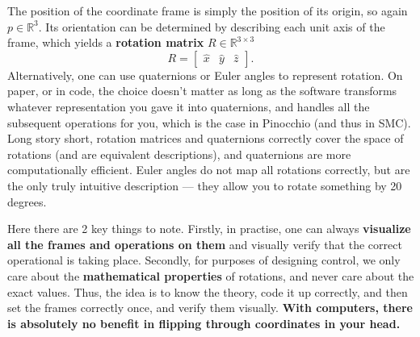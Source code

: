 The position of the coordinate frame is simply the position
of its origin, so again $  p \in \mathbb{R}^{3}    $.
Its orientation can be determined by describing each unit axis
of the frame, which yields a \textbf{rotation matrix}
$ R \in \mathbb{R}^{3 \times 3}  $
\begin{equation}
		R = \begin{bmatrix} \hat{x} & \hat{y} & \hat{z} \end{bmatrix} .
\end{equation}
Alternatively, one can use quaternions or Euler angles
to represent rotation.
On paper, or in code, the choice doesn't matter as long as the software
transforms whatever representation you gave it into
quaternions, and handles all the subsequent operations for you,
which is the case in Pinocchio (and thus in SMC).
Long story short, 
rotation matrices and quaternions correctly
cover the space of rotations (and are equivalent descriptions), 
and quaternions are more
computationally efficient.
Euler angles do not map all rotations correctly,
but are the only truly intuitive description ---
they allow you to rotate something by 20 degrees.

Here there are 2 key things to note.
Firstly, in practise, one can always \textbf{visualize all the frames and
operations on them} and visually verify that the correct 
operational is taking place.
Secondly, for purposes of designing control,
we only care about the \textbf{mathematical properties}
of rotations, and never care about the exact values.
Thus, the idea is to know the theory, code it up correctly,
and then set the frames correctly once, and verify them visually.
\textbf{With computers, there is absolutely no benefit in flipping
through coordinates in your head.}

